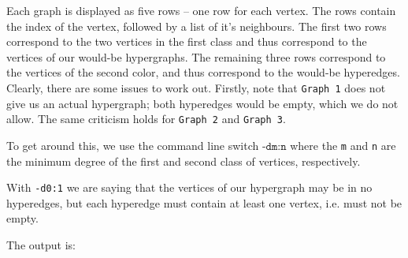 Each graph is displayed as five rows -- one row for each vertex.
The rows contain the index of the vertex, followed by a list of it's neighbours.
The first two rows correspond to the two vertices in the first class and thus correspond to the vertices of our would-be hypergraphs.
The remaining three rows correspond to the vertices of the second color, and thus correspond to the would-be hyperedges.
Clearly, there are some issues to work out. Firstly, note that \texttt{Graph 1} does not give us an actual hypergraph; both hyperedges would be empty, which we do not allow. The same criticism holds for \texttt{Graph 2} and \texttt{Graph 3}.

To get around this, we use the command line switch $\texttt{-dm:n}$ where the \texttt{m} and \texttt{n} are the minimum degree of the first and second class of vertices, respectively.

With \texttt{-d0:1} we are saying that the vertices of our hypergraph may be in no hyperedges, but each hyperedge must contain at least one vertex, i.e. must not be empty.


The output is:

